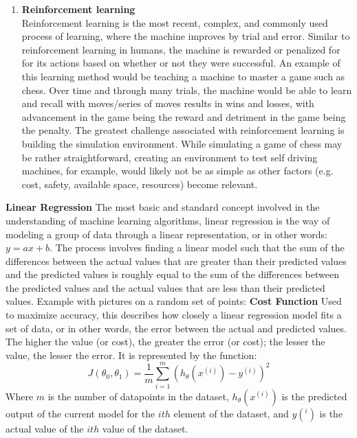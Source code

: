 \documentclass[11pt]{article}
\begin{document}
\begin{enumerate}
    \item \textbf{Reinforcement learning}\\
    Reinforcement learning is the most recent, complex, and commonly used process of learning, where the machine improves by trial and error. Similar to reinforcement learning in humans, the machine is rewarded or penalized for for its actions based on whether or not they were successful. An example of this learning method would be teaching a machine to master a game such as chess. Over time and through many trials, the machine would be able to learn and recall with moves/series of moves results in wins and losses, with advancement in the game being the reward and detriment in the game being the penalty. The greatest challenge associated with reinforcement learning is building the simulation environment. While simulating a game of chess may be rather straightforward, creating an environment to test self driving machines, for example, would likely not be as simple as other factors (e.g. cost, safety, available space, resources) become relevant.
 
\end{enumerate}
\textbf{Linear Regression}\newline
The most basic and standard concept involved in the understanding of machine learning algorithms, linear regression is the way of modeling a group of data through a linear representation, or in other words: $y=ax+b$. The process involves finding a linear model such that the sum of the differences between the actual values that are greater than their predicted values and the predicted values is roughly equal to the sum of the differences between the predicted values and the actual values that are less than their predicted values.\smallskip\newline
Example with pictures on a random set of points:\bigskip\newline
\textbf{Cost Function}\newline
Used to maximize accuracy, this describes how closely a linear regression model fits a set of data, or in other words, the error between the actual and predicted values. The higher the value (or cost), the greater the error (or cost); the lesser the value, the lesser the error. It is represented by the function: 
\[
    J(\theta_0,\theta_1) = \frac{1}{m} \sum_{i = 1}^{m}(h_{\theta}(x^{(i)})-y^{(i)})^{2}
\]
Where $m$ is the number of datapoints in the dataset, $h_{\theta}(x^{(i)})$ is the predicted output of the current model for the $ith$ element of the dataset, and $y(^i)$ is the actual value of the $ith$ value of the dataset.
\end{document}
